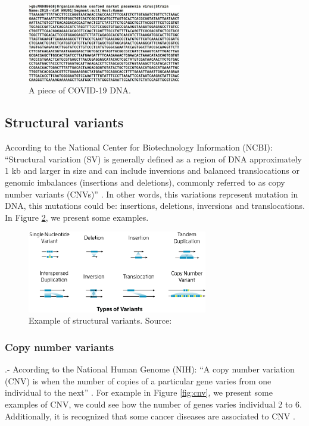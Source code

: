 \documentclass{svproc}
\begin{document}
\begin{figure}[H]
	\centering
	\includegraphics[width=0.6\textwidth]{img/splitthreader/dna}
	\caption{A piece of COVID-19 DNA.}
	\label{fig:dna}
\end{figure}

\subsection{Structural variants}
According to the National Center for Biotechnology Information (NCBI): ``Structural variation (SV) is generally defined as a region of DNA approximately 1 kb and larger in size and can include inversions and balanced translocations or genomic imbalances (insertions and deletions), commonly referred to as copy number variants (CNVs)'' \cite{sv_ncbi_2021}. In other words, this variations represent mutation in DNA, this mutations could be: insertions, deletions, inversions and translocations. In Figure \ref{fig:variants}, we present some examples.


\begin{figure}[h]
	\centering
	\includegraphics[width=0.7\textwidth]{img/splitthreader/variants}
	\caption{Example of structural variants. Source: \cite{sv_pacbio_2021}}
	\label{fig:variants}
\end{figure}

\subsubsection{Copy number variants}

.- According to the National Human Genome (NIH): ``A copy number variation (CNV) is when the number of copies of a particular gene varies from one individual to the next'' \cite{cnv_nih_2021}. For example in Figure \ref{fig:cnv}, we present some examples of CNV, we could see how the number of genes varies individual 2 to 6. Additionally, it is recognized that some cancer diseases are associated to CNV \cite{cnv_nih_2021, nattestad2016splitthreader, shlien2009copy, mitelman2007impact}.
\end{document}
